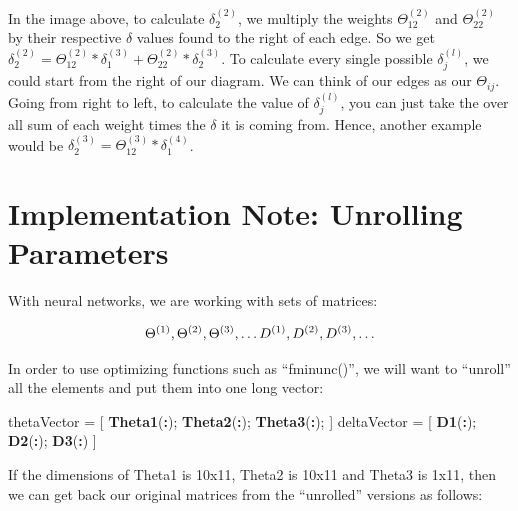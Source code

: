 \documentclass[
]{book}
\newenvironment{Shaded}{\begin{snugshade}}{\end{snugshade}}
\newcommand{\KeywordTok}[1]{\textcolor[rgb]{0.13,0.29,0.53}{\textbf{#1}}}
\newcommand{\NormalTok}[1]{#1}
\newcommand{\OperatorTok}[1]{\textcolor[rgb]{0.81,0.36,0.00}{\textbf{#1}}}
\newcommand{\StringTok}[1]{\textcolor[rgb]{0.31,0.60,0.02}{#1}}
\begin{document}
In the image above, to calculate \(\delta_2^{(2)}\), we multiply the weights \(\Theta_{12}^{(2)}\) and \(\Theta_{22}^{(2)}\) by their respective \(\delta\) values found to the right of each edge. So we get \(\delta_2^{(2)} = \Theta_{12}^{(2)} *\delta_1^{(3)} + \Theta_{22}^{(2)} *\delta_2^{(3)}\). To calculate every single possible \(\delta_j^{(l)}\), we could start from the right of our diagram. We can think of our edges as our \(\Theta_{ij}\). Going from right to left, to calculate the value of \(\delta_j^{(l)}\), you can just take the over all sum of each weight times the \(\delta\) it is coming from. Hence, another example would be \(\delta_2^{(3)} =\Theta_{12}^{(3)} *\delta_1^{(4)}\).

\hypertarget{implementation-note-unrolling-parameters}{%
\section{Implementation Note: Unrolling Parameters}\label{implementation-note-unrolling-parameters}}

With neural networks, we are working with sets of matrices:

\begin{align} \Theta^{(1)}, \Theta^{(2)}, \Theta^{(3)}, \dots \newline D^{(1)}, D^{(2)}, D^{(3)}, \dots \end{align}

In order to use optimizing functions such as ``fminunc()'', we will want to ``unroll'' all the elements and put them into one long vector:

\begin{Shaded}
\begin{Highlighting}[]
\NormalTok{thetaVector =}\StringTok{ }\NormalTok{[ }\KeywordTok{Theta1}\NormalTok{(}\OperatorTok{:}\NormalTok{); }\KeywordTok{Theta2}\NormalTok{(}\OperatorTok{:}\NormalTok{); }\KeywordTok{Theta3}\NormalTok{(}\OperatorTok{:}\NormalTok{); ]}
\NormalTok{deltaVector =}\StringTok{ }\NormalTok{[ }\KeywordTok{D1}\NormalTok{(}\OperatorTok{:}\NormalTok{); }\KeywordTok{D2}\NormalTok{(}\OperatorTok{:}\NormalTok{); }\KeywordTok{D3}\NormalTok{(}\OperatorTok{:}\NormalTok{) ]}
\end{Highlighting}
\end{Shaded}

If the dimensions of Theta1 is 10x11, Theta2 is 10x11 and Theta3 is 1x11, then we can get back our original matrices from the ``unrolled'' versions as follows:
\end{document}
